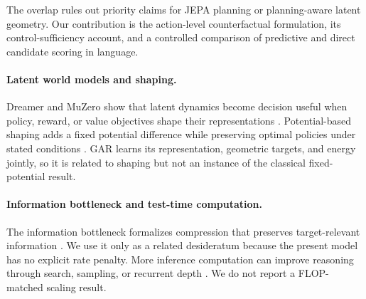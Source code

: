 The overlap rules out priority claims for JEPA planning or planning-aware latent geometry. Our contribution is the action-level counterfactual formulation, its control-sufficiency account, and a controlled comparison of predictive and direct candidate scoring in language.

\paragraph{Latent world models and shaping.}
Dreamer and MuZero show that latent dynamics become decision useful when policy, reward, or value objectives shape their representations \citep{hafner2020dreamer,schrittwieser2020muzero}. Potential-based shaping adds a fixed potential difference while preserving optimal policies under stated conditions \citep{ng1999policy}. GAR learns its representation, geometric targets, and energy jointly, so it is related to shaping but not an instance of the classical fixed-potential result.

\paragraph{Information bottleneck and test-time computation.}
The information bottleneck formalizes compression that preserves target-relevant information \citep{tishby2000information}. We use it only as a related desideratum because the present model has no explicit rate penalty. More inference computation can improve reasoning through search, sampling, or recurrent depth \citep{snell2024scaling,geiping2025recurrent}. We do not report a FLOP-matched scaling result.

